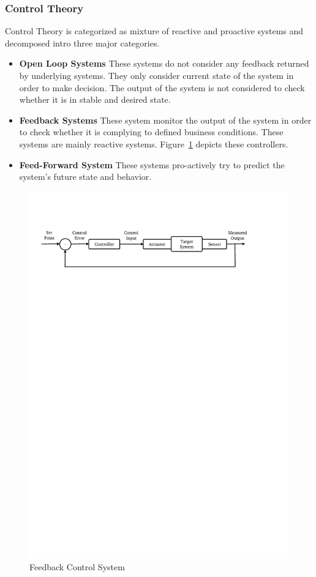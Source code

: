 \subsubsection{Control Theory}
Control Theory is categorized as mixture of reactive and proactive systems and decomposed intro three major categories.
\begin{itemize}
    \item \textbf{Open Loop Systems} These systems do not consider any feedback returned by underlying systems. They only consider current state of the system in order to make decision. The output of the system is not considered to check whether it is in stable and desired state.
    \item \textbf{Feedback Systems} These system monitor the output of the system in order to check whether it is complying to defined business conditions. These systems are mainly reactive systems. Figure~\ref{fig:feedback} depicts these controllers.
    \item \textbf{Feed-Forward System} These systems pro-actively try to predict the system's future state and behavior. 
\end{itemize}
\begin{figure}[!htbp]
    \centering
    \includegraphics[clip, trim=1.2cm 23.5cm 3.4cm 3cm]{control.pdf}
    \caption[Feedback Control System]{Feedback Control System\footnotemark}
    \label{fig:feedback}
\end{figure}
